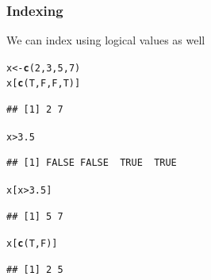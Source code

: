 \documentclass{beamer}\usepackage[]{graphicx}\usepackage[]{color}
\makeatletter
\newcommand{\hlnum}[1]{\textcolor[rgb]{0.686,0.059,0.569}{#1}}%
\newcommand{\hlopt}[1]{\textcolor[rgb]{0,0,0}{#1}}%
\newcommand{\hlstd}[1]{\textcolor[rgb]{0.345,0.345,0.345}{#1}}%
\newcommand{\hlkwb}[1]{\textcolor[rgb]{0.69,0.353,0.396}{#1}}%
\newcommand{\hlkwd}[1]{\textcolor[rgb]{0.737,0.353,0.396}{\textbf{#1}}}%
\newenvironment{kframe}{%
 \def\at@end@of@kframe{}%
 \ifinner\ifhmode%
  \def\at@end@of@kframe{\end{minipage}}%
  \begin{minipage}{\columnwidth}%
 \fi\fi%
 \def\FrameCommand##1{\hskip\@totalleftmargin \hskip-\fboxsep
 \colorbox{shadecolor}{##1}\hskip-\fboxsep
     \hskip-\linewidth \hskip-\@totalleftmargin \hskip\columnwidth}%
 \MakeFramed {\advance\hsize-\width
   \@totalleftmargin\z@ \linewidth\hsize
   \@setminipage}}%
 {\par\unskip\endMakeFramed%
 \at@end@of@kframe}
\newenvironment{knitrout}{}{} %
\makeatother
\begin{document}
\begin{frame}[fragile]
    \frametitle{Indexing}
We can index using logical values as well
\begin{knitrout}\footnotesize
{}\color{fgcolor}\begin{kframe}
\begin{alltt}
\hlstd{x} \hlkwb{<-} \hlkwd{c}\hlstd{(}\hlnum{2}\hlstd{,} \hlnum{3}\hlstd{,} \hlnum{5}\hlstd{,} \hlnum{7}\hlstd{)}
\hlstd{x[}\hlkwd{c}\hlstd{(T, F, F, T)]}
\end{alltt}
\begin{verbatim}
## [1] 2 7
\end{verbatim}
\begin{alltt}
\hlstd{x} \hlopt{>} \hlnum{3.5}
\end{alltt}
\begin{verbatim}
## [1] FALSE FALSE  TRUE  TRUE
\end{verbatim}
\begin{alltt}
\hlstd{x[x} \hlopt{>} \hlnum{3.5}\hlstd{]}
\end{alltt}
\begin{verbatim}
## [1] 5 7
\end{verbatim}
\begin{alltt}
\hlstd{x[}\hlkwd{c}\hlstd{(T, F)]}
\end{alltt}
\begin{verbatim}
## [1] 2 5
\end{verbatim}
\end{kframe}
\end{knitrout}

\end{frame}
\end{document}
